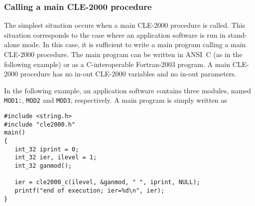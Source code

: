 \subsubsection {Calling a main CLE-2000 procedure}

The simplest situation occurs when a main CLE-2000 procedure is called. This situation corresponds to the case where an application
software is run in stand-alone mode. In this case, it is sufficient to write a main program calling a main CLE-2000 procedure. The main
program can be written in ANSI~C (as in the following example) or as a C-interoperable Fortran-2003 program. A main CLE-2000 procedure
has no in-out CLE-2000 variables and no in-out parameters.

\vskip 0.08cm

In the following example, an application software contains three modules, named {\tt MOD1:}, {\tt MOD2} and {\tt MOD3}, respectively.
A main program is simply written as

\begin{verbatim}
#include <string.h>
#include "cle2000.h"
main()
{
   int_32 iprint = 0;
   int_32 ier, ilevel = 1;
   int_32 ganmod();

   ier = cle2000_c(ilevel, &ganmod, " ", iprint, NULL);
   printf("end of execution; ier=%d\n", ier);
}
\end{verbatim}

